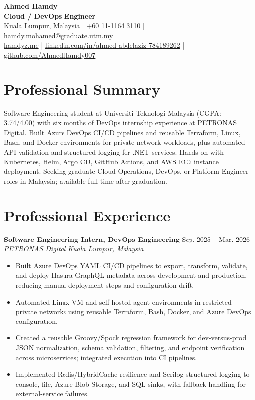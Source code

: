 \documentclass[10pt,a4paper]{article}
\newcommand{\entryheader}[4]{%
  \textbf{#1} \hfill #2\\[-1pt]
  \textit{#3} \hfill \textit{#4}\\[-2pt]
}
\begin{document}
\begin{center}
  {\LARGE\bfseries Ahmed Hamdy}\\[2pt]
  {\normalsize\bfseries Cloud / DevOps Engineer}\\[3pt]
  Kuala Lumpur, Malaysia \quad | \quad +60 11-1164 3110 \quad | \quad \href{mailto:hamdy.mohamed@graduate.utm.my}{hamdy.mohamed@graduate.utm.my}\\[2pt]
  \href{https://www.hamdyz.me}{hamdyz.me} \quad | \quad
  \href{https://www.linkedin.com/in/ahmed-abdelaziz-784189262}{linkedin.com/in/ahmed-abdelaziz-784189262} \quad | \quad
  \href{https://github.com/AhmedHamdy007}{github.com/AhmedHamdy007}
\end{center}

\section*{Professional Summary}
Software Engineering student at Universiti Teknologi Malaysia (CGPA: 3.74/4.00) with six months of DevOps internship experience at PETRONAS Digital. Built Azure DevOps CI/CD pipelines and reusable Terraform, Linux, Bash, and Docker environments for private-network workloads, plus automated API validation and structured logging for .NET services. Hands-on with Kubernetes, Helm, Argo CD, GitHub Actions, and AWS EC2 instance deployment. Seeking graduate Cloud Operations, DevOps, or Platform Engineer roles in Malaysia; available full-time after graduation.

\section*{Professional Experience}
\entryheader{Software Engineering Intern, DevOps Engineering}{Sep. 2025 -- Mar. 2026}{PETRONAS Digital}{Kuala Lumpur, Malaysia}
\begin{itemize}
  \item Built Azure DevOps YAML CI/CD pipelines to export, transform, validate, and deploy Hasura GraphQL metadata across development and production, reducing manual deployment steps and conf{}iguration drift.
  \item Automated Linux VM and self-hosted agent environments in restricted private networks using reusable Terraform, Bash, Docker, and Azure DevOps conf{}iguration.
  \item Created a reusable Groovy/Spock regression framework for dev-versus-prod JSON normalization, schema validation, f{}iltering, and endpoint verif{}ication across microservices; integrated execution into CI pipelines.
  \item Implemented Redis/HybridCache resilience and Serilog structured logging to console, f{}ile, Azure Blob Storage, and SQL sinks, with fallback handling for external-service failures.
\end{itemize}
\end{document}
